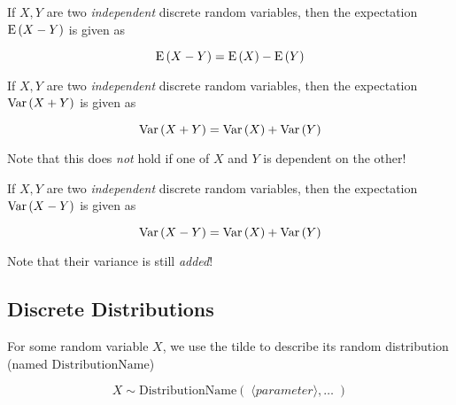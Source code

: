 \begin{definition}
    If $X, Y$ are two \textit{independent} discrete random variables, then the
    expectation $\mathrm{E} \left( X - Y \right)$ is given as

    \begin{equation}
        \mathrm{E} \left( X - Y \right) = \mathrm{E} \left( X \right) - \mathrm{E} \left( Y \right)
    \end{equation}
\end{definition}

\begin{definition}
    If $X, Y$ are two \textit{independent} discrete random variables, then the
    expectation $\mathrm{Var} \left( X + Y \right)$ is given as

    \begin{equation}
        \mathrm{Var} \left( X + Y \right) = \mathrm{Var} \left( X \right) + \mathrm{Var} \left( Y \right)
    \end{equation}

    Note that this does \textit{not} hold if one of $X$ and $Y$ is dependent
    on the other!
\end{definition}

\begin{definition}
    If $X, Y$ are two \textit{independent} discrete random variables, then the
    expectation $\mathrm{Var} \left( X - Y \right)$ is given as

    \begin{equation}
        \mathrm{Var} \left( X - Y \right) = \mathrm{Var} \left( X \right) + \mathrm{Var} \left( Y \right)
    \end{equation}

    Note that their variance is still \textit{added}!
\end{definition}

\subsection{Discrete Distributions}

\begin{definition}
    For some random variable $X$, we use the tilde to describe its random
    distribution (named $\mathrm{DistributionName}$)

    \begin{equation}
        X \sim \mathrm{DistributionName}(\;
            \langle \mathit{parameter} \rangle, \dots \;)
    \end{equation}
\end{definition}

